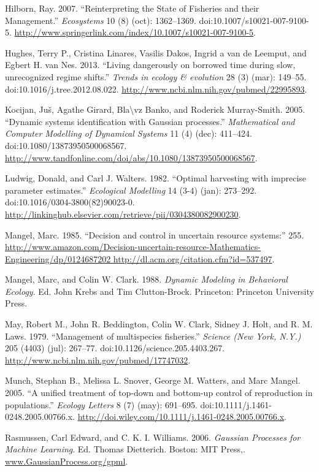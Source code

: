 \documentclass[author-year, review]{elsarticle} %
\begin{document}
Hilborn, Ray. 2007. ``Reinterpreting the State of Fisheries and their
Management.'' \emph{Ecosystems} 10 (8) (oct): 1362--1369.
doi:10.1007/s10021-007-9100-5.
\url{http://www.springerlink.com/index/10.1007/s10021-007-9100-5}.

Hughes, Terry P., Cristina Linares, Vasilis Dakos, Ingrid a van de
Leemput, and Egbert H. van Nes. 2013. ``Living dangerously on borrowed
time during slow, unrecognized regime shifts.'' \emph{Trends in ecology
\& evolution} 28 (3) (mar): 149--55. doi:10.1016/j.tree.2012.08.022.
\url{http://www.ncbi.nlm.nih.gov/pubmed/22995893}.

Kocijan, Juš, Agathe Girard, Bla\textbackslash{}vz Banko, and Roderick
Murray-Smith. 2005. ``Dynamic systems identification with Gaussian
processes.'' \emph{Mathematical and Computer Modelling of Dynamical
Systems} 11 (4) (dec): 411--424. doi:10.1080/13873950500068567.
\url{http://www.tandfonline.com/doi/abs/10.1080/13873950500068567}.

Ludwig, Donald, and Carl J. Walters. 1982. ``Optimal harvesting with
imprecise parameter estimates.'' \emph{Ecological Modelling} 14 (3-4)
(jan): 273--292. doi:10.1016/0304-3800(82)90023-0.
\url{http://linkinghub.elsevier.com/retrieve/pii/0304380082900230}.

Mangel, Marc. 1985. ``Decision and control in uncertain resource
systems:'' 255.
\href{http://www.amazon.com/Decision-uncertain-resource-Mathematics-Engineering/dp/0124687202 http://dl.acm.org/citation.cfm?id=537497}{http://www.amazon.com/Decision-uncertain-resource-Mathematics-Engineering/dp/0124687202
http://dl.acm.org/citation.cfm?id=537497}.

Mangel, Marc, and Colin W. Clark. 1988. \emph{Dynamic Modeling in
Behavioral Ecology}. Ed. John Krebs and Tim Clutton-Brock. Princeton:
Princeton University Press.

May, Robert M., John R. Beddington, Colin W. Clark, Sidney J. Holt, and
R. M. Laws. 1979. ``Management of multispecies fisheries.''
\emph{Science (New York, N.Y.)} 205 (4403) (jul): 267--77.
doi:10.1126/science.205.4403.267.
\url{http://www.ncbi.nlm.nih.gov/pubmed/17747032}.

Munch, Stephan B., Melissa L. Snover, George M. Watters, and Marc
Mangel. 2005. ``A unified treatment of top-down and bottom-up control of
reproduction in populations.'' \emph{Ecology Letters} 8 (7) (may):
691--695. doi:10.1111/j.1461-0248.2005.00766.x.
\url{http://doi.wiley.com/10.1111/j.1461-0248.2005.00766.x}.

Rasmussen, Carl Edward, and C. K. I. Williams. 2006. \emph{Gaussian
Processes for Machine Learning}. Ed. Thomas Dietterich. Boston: MIT
Press,. \url{www.GaussianProcess.org/gpml}.
\end{document}
